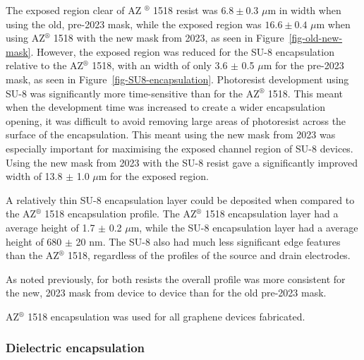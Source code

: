 \documentclass[
  a4paper,
]{scrbook}
\begin{document}
The exposed region clear of AZ \(^\circledR\) 1518 resist was
\(6.8 \pm 0.3\) \(\mu\)m in width when using the old, pre-2023 mask,
while the exposed region was \(16.6 \pm 0.4\) \(\mu\)m when using
AZ\(^\circledR\) 1518 with the new mask from 2023, as seen in
Figure~\ref{fig-old-new-mask}. However, the exposed region was reduced
for the SU-8 encapsulation relative to the AZ\(^\circledR\) 1518, with
an width of only 3.6 \(\pm\) 0.5 \(\mu\)m for the pre-2023 mask, as seen
in Figure~\ref{fig-SU8-encapsulation}. Photoresist development using
SU-8 was significantly more time-sensitive than for the AZ\(^\circledR\)
1518. This meant when the development time was increased to create a
wider encapsulation opening, it was difficult to avoid removing large
areas of photoresist across the surface of the encapsulation. This meant
using the new mask from 2023 was especially important for maximising the
exposed channel region of SU-8 devices. Using the new mask from 2023
with the SU-8 resist gave a significantly improved width of 13.8 \(\pm\)
1.0 \(\mu\)m for the exposed region.

A relatively thin SU-8 encapsulation layer could be deposited when
compared to the AZ\(^\circledR\) 1518 encapsulation profile. The
AZ\(^\circledR\) 1518 encapsulation layer had a average height of 1.7
\(\pm\) 0.2 \(\mu\)m, while the SU-8 encapsulation layer had a average
height of 680 \(\pm\) 20 nm. The SU-8 also had much less significant
edge features than the AZ\(^\circledR\) 1518, regardless of the profiles
of the source and drain electrodes.

As noted previously, for both resists the overall profile was more
consistent for the new, 2023 mask from device to device than for the old
pre-2023 mask.

AZ\(^\circledR\) 1518 encapsulation was used for all graphene devices
fabricated.

\hypertarget{dielectric-encapsulation}{%
\subsubsection*{Dielectric
encapsulation}\label{dielectric-encapsulation}}
\end{document}
